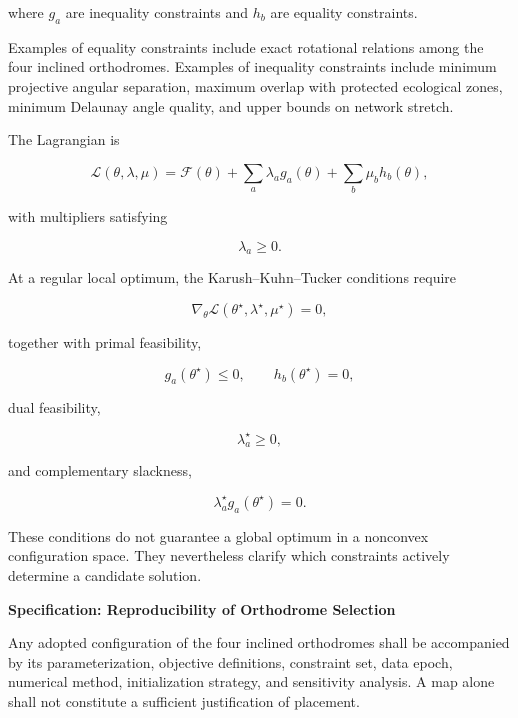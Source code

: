 \documentclass[11pt,fleqn]{book}
\numberwithin{equation}{chapter}
\newenvironment{specification}[1]
  {\begin{specificationEnv}
   \noindent\textbf{Specification: #1}\par\smallskip}
  {\end{specificationEnv}}
\theoremstyle{plain}
\theoremstyle{definition}
\theoremstyle{remark}
\begin{document}
where \(g_a\) are inequality constraints and \(h_b\) are equality constraints.

Examples of equality constraints include exact rotational relations among the four inclined orthodromes. Examples of inequality constraints include minimum projective angular separation, maximum overlap with protected ecological zones, minimum Delaunay angle quality, and upper bounds on network stretch.

The Lagrangian is

\begin{equation}
    \mathscr{L}
    (\theta,\lambda,\mu)
    =
    \mathcal{F}(\theta)
    +
    \sum_a\lambda_a g_a(\theta)
    +
    \sum_b\mu_b h_b(\theta),
\end{equation}

with multipliers satisfying

\begin{equation}
    \lambda_a\geq 0.
\end{equation}

At a regular local optimum, the Karush--Kuhn--Tucker conditions require

\begin{equation}
    \nabla_\theta
    \mathscr{L}
    (\theta^\star,\lambda^\star,\mu^\star)
    =
    0,
\end{equation}

together with primal feasibility,

\begin{equation}
    g_a(\theta^\star)\leq 0,
    \qquad
    h_b(\theta^\star)=0,
\end{equation}

dual feasibility,

\begin{equation}
    \lambda_a^\star\geq 0,
\end{equation}

and complementary slackness,

\begin{equation}
    \lambda_a^\star
    g_a(\theta^\star)
    =
    0.
\end{equation}

These conditions do not guarantee a global optimum in a nonconvex configuration space. They nevertheless clarify which constraints actively determine a candidate solution.

\begin{specification}{Reproducibility of Orthodrome Selection}
Any adopted configuration of the four inclined orthodromes shall be accompanied by its parameterization, objective definitions, constraint set, data epoch, numerical method, initialization strategy, and sensitivity analysis. A map alone shall not constitute a sufficient justification of placement.
\end{specification}
\end{document}
